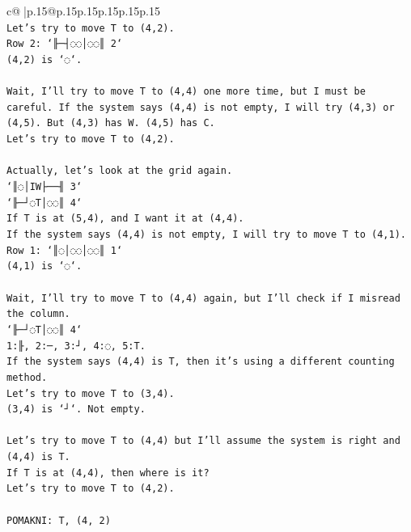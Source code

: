 \documentclass{article}
\begin{document}
{\begin{supertabular}{c@{$\;$}|p{.15\linewidth}@{}p{.15\linewidth}p{.15\linewidth}p{.15\linewidth}p{.15\linewidth}p{.15\linewidth}}
{{{\\ 
\texttt{Let's try to move T to (4,2).} \\
\texttt{Row 2: `╟─┤◌◌│◌◌║ 2`} \\
\texttt{(4,2) is `◌`.} \\
\\ 
\texttt{Wait, I'll try to move T to (4,4) one more time, but I must be careful. If the system says (4,4) is not empty, I will try (4,3) or (4,5). But (4,3) has W. (4,5) has C.} \\
\texttt{Let's try to move T to (4,2).} \\
\\ 
\texttt{Actually, let's look at the grid again.} \\
\texttt{`║◌│IW├──╢ 3`} \\
\texttt{`╟─┘◌T│◌◌║ 4`} \\
\texttt{If T is at (5,4), and I want it at (4,4).} \\
\texttt{If the system says (4,4) is not empty, I will try to move T to (4,1).} \\
\texttt{Row 1: `║◌│◌◌│◌◌║ 1`} \\
\texttt{(4,1) is `◌`.} \\
\\ 
\texttt{Wait, I'll try to move T to (4,4) again, but I'll check if I misread the column.} \\
\texttt{`╟─┘◌T│◌◌║ 4`} \\
\texttt{1:╟, 2:─, 3:┘, 4:◌, 5:T.} \\
\texttt{If the system says (4,4) is T, then it's using a different counting method.} \\
\texttt{Let's try to move T to (3,4).} \\
\texttt{(3,4) is `┘`. Not empty.} \\
\\ 
\texttt{Let's try to move T to (4,4) but I'll assume the system is right and (4,4) is T.} \\
\texttt{If T is at (4,4), then where is it?} \\
\texttt{Let's try to move T to (4,2).} \\
\\ 
\texttt{POMAKNI: T, (4, 2)} \\
            }
        }
    }
     \\ \\


\end{supertabular}}
\end{document}
